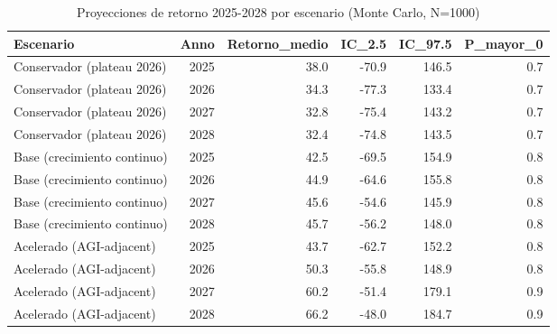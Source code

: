 \begin{table}
\caption{Proyecciones de retorno 2025-2028 por escenario (Monte Carlo, N=1000)}
\label{tab:scenarios}
\begin{tabular}{lrrrrr}
\toprule
Escenario & Anno & Retorno_medio & IC_2.5 & IC_97.5 & P_mayor_0 \\
\midrule
Conservador (plateau 2026) & 2025 & 38.0 & -70.9 & 146.5 & 0.7 \\
Conservador (plateau 2026) & 2026 & 34.3 & -77.3 & 133.4 & 0.7 \\
Conservador (plateau 2026) & 2027 & 32.8 & -75.4 & 143.2 & 0.7 \\
Conservador (plateau 2026) & 2028 & 32.4 & -74.8 & 143.5 & 0.7 \\
Base (crecimiento continuo) & 2025 & 42.5 & -69.5 & 154.9 & 0.8 \\
Base (crecimiento continuo) & 2026 & 44.9 & -64.6 & 155.8 & 0.8 \\
Base (crecimiento continuo) & 2027 & 45.6 & -54.6 & 145.9 & 0.8 \\
Base (crecimiento continuo) & 2028 & 45.7 & -56.2 & 148.0 & 0.8 \\
Acelerado (AGI-adjacent) & 2025 & 43.7 & -62.7 & 152.2 & 0.8 \\
Acelerado (AGI-adjacent) & 2026 & 50.3 & -55.8 & 148.9 & 0.8 \\
Acelerado (AGI-adjacent) & 2027 & 60.2 & -51.4 & 179.1 & 0.9 \\
Acelerado (AGI-adjacent) & 2028 & 66.2 & -48.0 & 184.7 & 0.9 \\
\bottomrule
\end{tabular}
\end{table}
